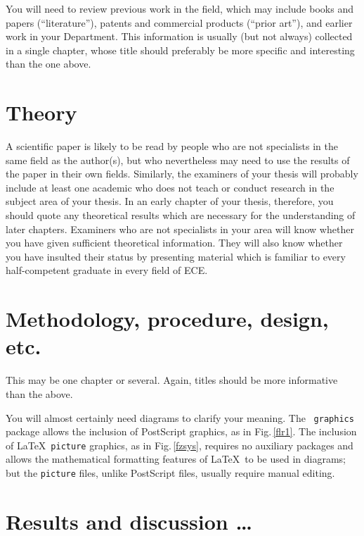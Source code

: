 \documentclass[12pt,openany,a4paper]{book}
\newcommand{\fig}[1]  {Fig.\,\ref{#1}}		%
\begin{document}
You will need to review previous work in the field, which may include
books and papers (``literature''), patents and commercial products
(``prior art''), and earlier work in your Department.  This
information is usually (but not always) collected in a single chapter,
whose title should preferably be more specific and interesting than
the one above.

\chapter{Theory}

A scientific paper is likely to be read by people who are not
specialists in the same field as the author(s), but who nevertheless
may need to use the results of the paper in their own fields.
Similarly, the examiners of your thesis will probably include at least
one academic who does not teach or conduct research in the subject
area of your thesis.  In an early chapter of your thesis, therefore,
you should quote any theoretical results which are necessary for the
understanding of later chapters.  Examiners who are not specialists in
your area will know whether you have given sufficient theoretical
information.  They will also know whether you have insulted their
status by presenting material which is familiar to every
half-competent graduate in every field of ECE.

\chapter{Methodology, procedure, design, etc.}

This may be one chapter or several.  Again, titles should be more
informative than the above.

You will almost certainly need diagrams to clarify your meaning.  The
\LaTeXe\ \texttt{graphics} package allows the inclusion of PostScript
graphics, as in \fig{flr1}.  The inclusion of \LaTeX\ \texttt{picture}
graphics, as in \fig{fzsys}, requires no auxiliary packages and allows
the mathematical formatting features of \LaTeX\ to be used in
diagrams; but the \texttt{picture} files, unlike PostScript files,
usually require manual editing.





\chapter{Results and discussion \ldots}
\end{document}
